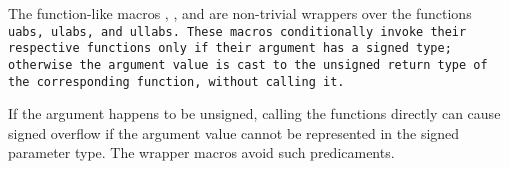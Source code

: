 The function-like macros , , and  are
non-trivial wrappers over the functions \tt{uabs}, \tt{ulabs}, and \tt{ullabs}.
These macros conditionally invoke their respective functions only if their
argument has a signed type; otherwise the argument value is cast to the
unsigned return type of the corresponding function, without calling it.

\note If the argument happens to be unsigned, calling the
functions directly can cause signed overflow if the argument
value cannot be represented in the signed parameter type.
The wrapper macros avoid such predicaments.
